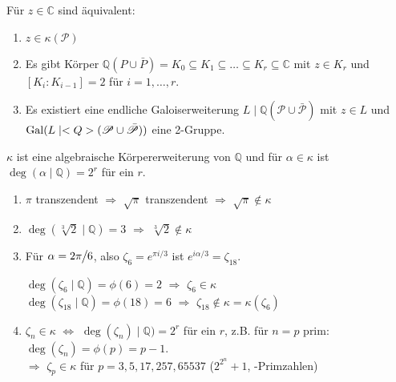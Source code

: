 \begin{theorem}
	Für $z\in\mathbb C$ sind äquivalent: \begin{enumerate}[label={(\arabic*)}]
		\item $z\in\kappa(\mathscr P)$
		\item Es gibt Körper $\mathbb Q(P\cup \bar P) = K_0\subseteq K_1 \subseteq \dots\subseteq K_r \subseteq \mathbb C$ mit $z\in K_r$ und $[K_i : K_{i-1}] = 2$ für $i=1,\dots,r$.
		\item Es existiert eine endliche Galoiserweiterung $L\mid \mathbb Q(\mathscr P\cup \bar{\mathscr P})$ mit $z \in L$ und $\operatorname{Gal}(L\mid <Q>(\mathscr P\cup \bar{\mathscr P}))$ eine 2-Gruppe.
	\end{enumerate}
\end{theorem}

\begin{conclusion}
	$\kappa$ ist eine algebraische Körpererweiterung von $\mathbb Q$ und für $\alpha\in\kappa$ ist $\deg(\alpha\mid \mathbb Q) = 2^r$ für ein $r$.
\end{conclusion}

\begin{example}
	\begin{enumerate}[label={\alph*)}]
		\item $\pi$ transzendent $\Rightarrow$ $\sqrt \pi$ transzendent $\Rightarrow$ $\sqrt\pi\notin\kappa$
		\item $\deg(\sqrt[3]2\mid \mathbb Q) = 3$ $\Rightarrow$ $\sqrt[3]2\notin\kappa$
		\item Für $\alpha = 2\pi\mskip-1mu\big\slash\mskip-1mu 6$, also $\zeta_6 = e^{\pi i / 3}$ ist $e^{i\alpha / 3} = \zeta_{18}$.
		
		$\deg(\zeta_6\mid\mathbb Q) = \phi(6) = 2$ $\Rightarrow$ $\zeta_6\in \kappa$ \\
		$\deg(\zeta_{18}\mid\mathbb Q) = \phi(18) = 6$ $\Rightarrow$ $\zeta_{18}\notin\kappa = \kappa(\zeta_6)$
		\item $\zeta_n\in\kappa$ $\Leftrightarrow$ $\deg(\zeta_n)\mid\mathbb Q) = 2^r$ für ein $r$, z.B. für $n=p$ prim: $\deg(\zeta_n) = \phi(p) = p-1$.\\
		\hspace*{0.5em}$\Rightarrow$ $\zeta_p\in\kappa$ für $p=3,5,17,257,65537$ ($2^{2^n}+1$, -Primzahlen)
	\end{enumerate}
\end{example}
